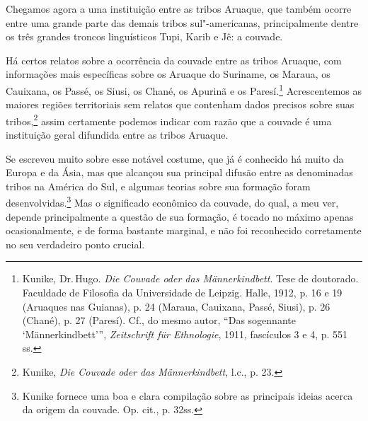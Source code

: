 Chegamos agora a uma instituição entre as tribos Aruaque, que também
ocorre entre uma grande parte das demais tribos sul"-americanas,
principalmente dentre os três grandes troncos linguísticos Tupi, Karib
e Jê: a couvade.

Há certos relatos sobre a ocorrência da couvade entre as tribos Aruaque,
com informações mais específicas sobre os Aruaque do Suriname, os
Maraua, os Cauixana, os Passé, os Siusi, os Chané, os Apurinã e os
Paresí.\footnote{Kunike, Dr.\,Hugo. \emph{Die Couvade oder das
  Männerkindbett}. Tese de doutorado. Faculdade de Filosofia da
  Universidade de Leipzig. Halle, 1912, p. 16 e 19 (Aruaques nas
  Guianas), p. 24 (Maraua, Cauixana, Passé, Siusi), p. 26 (Chané), p. 27
  (Paresí). Cf., do mesmo autor, ``Das sogennante `Männerkindbett''',
  \emph{Zeitschrift für Ethnologie}, 1911, fascículos 3 e 4, p. 551 ss.}
Acrescentemos as maiores regiões territoriais sem relatos que contenham
dados precisos sobre suas tribos,\footnote{Kunike, \emph{Die Couvade oder
  das Männerkindbett}, l.c., p. 23.} assim certamente podemos indicar
com razão que a couvade é uma instituição geral difundida entre as
tribos Aruaque.

Se escreveu muito sobre esse notável costume, que já é conhecido há
muito da Europa e da Ásia, mas que alcançou sua principal difusão entre
as denominadas tribos na América do Sul, e algumas teorias sobre sua
formação foram desenvolvidas.\footnote{Kunike fornece uma boa e clara
  compilação sobre as principais ideias acerca da origem da couvade. Op.
  cit., p. 32ss.} Mas o significado econômico da couvade, do qual, a
meu ver, depende principalmente a questão de sua formação, é tocado no
máximo apenas ocasionalmente, e de forma bastante marginal, e não foi
reconhecido corretamente no seu verdadeiro ponto crucial.

